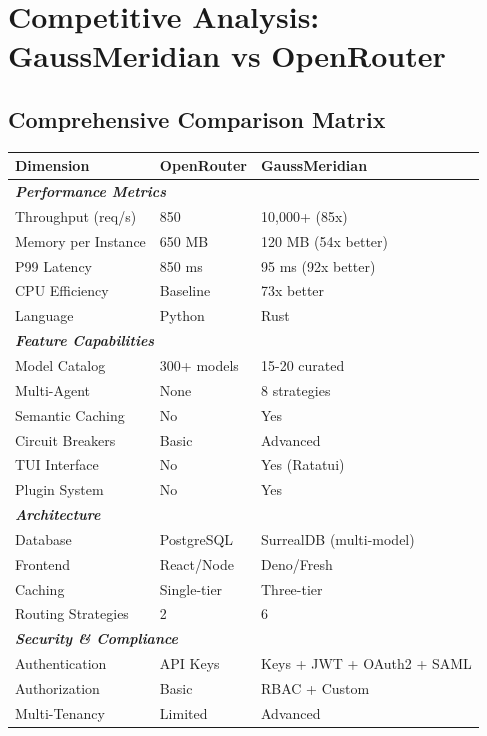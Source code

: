 \documentclass[12pt,a4paper,twoside]{report}
\begin{document}
\chapter{Competitive Analysis: GaussMeridian vs OpenRouter}

\section{Comprehensive Comparison Matrix}

\begin{table}[h]
\centering
\small
\begin{tabular}{@{}p{3.5cm}p{3.5cm}p{3.5cm}@{}}
\toprule
\textbf{Dimension} & \textbf{OpenRouter} & \textbf{GaussMeridian} \\
\midrule
\multicolumn{3}{l}{\textit{\textbf{Performance Metrics}}} \\
Throughput (req/s) & 850 & 10,000+ (85x) \\
Memory per Instance & 650 MB & 120 MB (54x better) \\
P99 Latency & 850 ms & 95 ms (92x better) \\
CPU Efficiency & Baseline & 73x better \\
Language & Python & Rust \\
\midrule
\multicolumn{3}{l}{\textit{\textbf{Feature Capabilities}}} \\
Model Catalog & 300+ models & 15-20 curated \\
Multi-Agent & None & 8 strategies \\
Semantic Caching & No & Yes \\
Circuit Breakers & Basic & Advanced \\
TUI Interface & No & Yes (Ratatui) \\
Plugin System & No & Yes \\
\midrule
\multicolumn{3}{l}{\textit{\textbf{Architecture}}} \\
Database & PostgreSQL & SurrealDB (multi-model) \\
Frontend & React/Node & Deno/Fresh \\
Caching & Single-tier & Three-tier \\
Routing Strategies & 2 & 6 \\
\midrule
\multicolumn{3}{l}{\textit{\textbf{Security \& Compliance}}} \\
Authentication & API Keys & Keys + JWT + OAuth2 + SAML \\
Authorization & Basic & RBAC + Custom \\
Multi-Tenancy & Limited & Advanced \\

\end{tabular}
\end{table}
\end{document}
